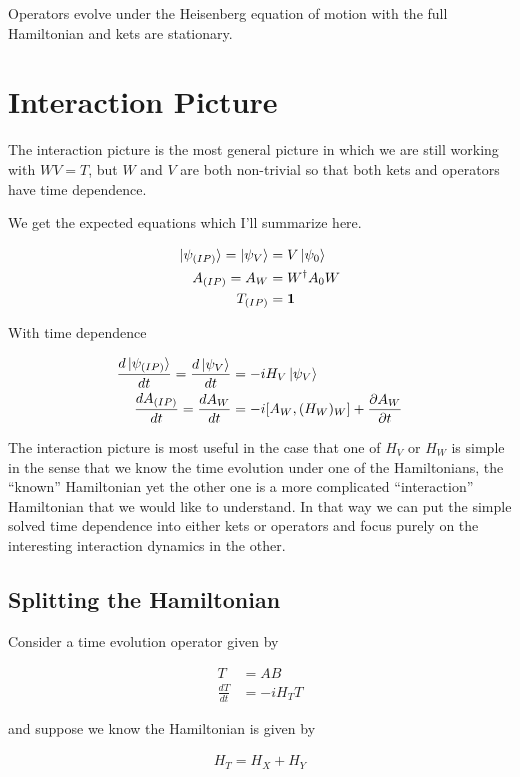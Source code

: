 \documentclass[12pt]{article}
\newcommand{\ddt}[1]{\frac{d #1}{dt}}
\newcommand{\ppt}[1]{\frac{\partial #1}{\partial t}}
\newcommand{\bv}[1]{\boldsymbol{#1}}
\begin{document}
Operators evolve under the Heisenberg equation of motion with the full Hamiltonian and kets are stationary.

\section{Interaction Picture}

The interaction picture is the most general picture in which we are still working with $WV = T$, but $W$ and $V$ are both non-trivial so that both kets and operators have time dependence.

We get the expected equations which I'll summarize here.

\begin{align}
\ket{\psi_{(IP)}} = \ket{\psi_V} &= V \ket{\psi_0}\\
A_{(IP)} = A_W &= W^{\dag} A_0 W\\
T_{(IP)} &= \bv{1}
\end{align}

With time dependence

\begin{align}
\ddt{\ket{\psi_{(IP)}}} = \ddt{\ket{\psi_V}} &= -i H_V \ket{\psi_V}\\
\ddt{A_{(IP)}} = \ddt{A_W} & = -i[A_W,(H_W)_W] + \ppt{A_W}
\end{align}

The interaction picture is most useful in the case that one of $H_V$ or $H_W$ is simple in the sense that we know the time evolution under one of the Hamiltonians, the ``known'' Hamiltonian yet the other one is a more complicated ``interaction'' Hamiltonian that we would like to understand. In that way we can put the simple solved time dependence into either kets or operators and focus purely on the interesting interaction dynamics in the other.

\subsection{Splitting the Hamiltonian}

Consider a time evolution operator given by

\begin{align}
T &= AB\\
\ddt{T} &= -i H_T T
\end{align}

and suppose we know the Hamiltonian is given by

\begin{align}
H_T = H_X + H_Y
\end{align}
\end{document}
